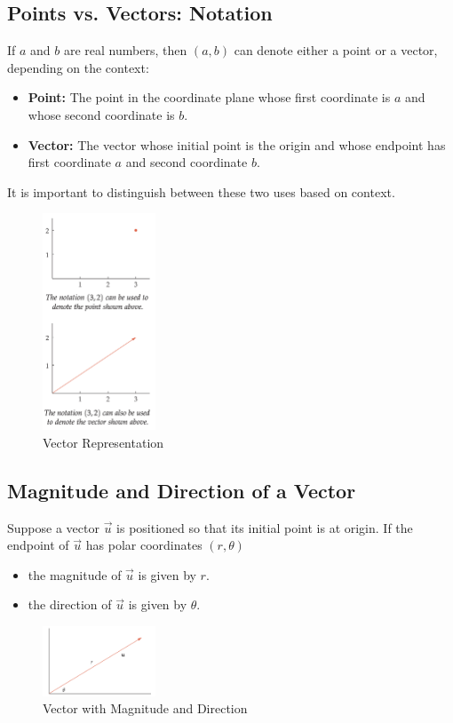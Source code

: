 \subsection{Points vs. Vectors: Notation}
If \(a\) and \(b\) are real numbers, then \((a, b)\) can denote either a point or a vector, depending on the context:
\begin{itemize}
    \item \textbf{Point:} The point in the coordinate plane whose first coordinate is \(a\) and whose second coordinate is \(b\).
    \item \textbf{Vector:} The vector whose initial point is the origin and whose endpoint has first coordinate \(a\) and second coordinate \(b\).
\end{itemize}
It is important to distinguish between these two uses based on context.
\begin{figure}
    \centering
    \includegraphics[width=0.3\textwidth]{pics/vector1.png}
    \caption{Vector Representation}
    \label{fig:vector_representation}
\end{figure}

\subsection{Magnitude and Direction of a Vector}
Suppose a vector \(\vec{u}\) is positioned so that its initial point is at origin. If the endpoint of \(\vec{u}\) has polar coordinates \((r, \theta)\)
\begin{itemize}
    \item the magnitude of \(\vec{u}\) is given by \(r\).
    \item the direction of \(\vec{u}\) is given by \(\theta\).
\end{itemize}
\begin{figure}
    \centering
    \includegraphics[width=0.3\textwidth]{pics/vector2.png}
    \caption{Vector with Magnitude and Direction}
    \label{fig:vector_magnitude_direction}
\end{figure}


